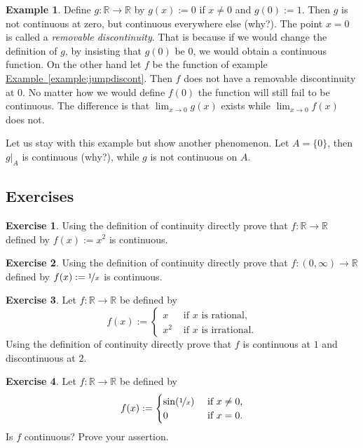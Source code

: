 \documentclass[12pt]{book}
\newcommand{\R}{{\mathbb{R}}}
\newcommand{\myindex}[1]{#1\index{#1}}
\theoremstyle{plain}
\theoremstyle{remark}
\theoremstyle{definition}
\theoremstyle{exercise}
\newtheorem{exercise}{Exercise}[section]
\theoremstyle{example}
\newtheorem{example}[thm]{Example}
\newcommand{\exampleref}[1]{\hyperref[#1]{Example~\ref*{#1}}}
\begin{document}
\begin{example}
Define
$g \colon \R \to \R$ by $g(x) := 0$ if $x \not= 0$ and
$g(0) := 1$.  Then $g$ is not continuous at zero, but continuous everywhere else (why?).
The point $x=0$ is called a \emph{\myindex{removable discontinuity}}.  That
is because if we would change the definition of $g$, by insisting that
$g(0)$ be $0$, we would obtain a continuous function.  On the other hand
let $f$ be the function of example \exampleref{example:jumpdiscont}.
Then $f$ does not have a
removable discontinuity at $0$.  No matter how we would define $f(0)$ the function
will still fail to be continuous.  The difference is that 
$\lim_{x\to 0} g(x)$ exists while
$\lim_{x\to 0} f(x)$ does not.

Let us stay with this example but show another phenomenon.  Let $A = \{ 0
\}$, then $g|_A$ is continuous (why?), while $g$ is not continuous on $A$.
\end{example}

\subsection{Exercises}

\begin{exercise}
Using the definition of continuity directly prove that
$f \colon \R \to \R$ defined by
$f(x) := x^2$ is continuous.
\end{exercise}

\begin{exercise}
Using the definition of continuity directly prove that
$f \colon (0,\infty) \to \R$ defined by
$f(x) := \nicefrac{1}{x}$ is continuous.
\end{exercise}

\begin{exercise}
Let $f \colon \R \to \R$ be defined by
\begin{equation*}
f(x) :=
\begin{cases}
x & \text{ if $x$ is rational,} \\
x^2 & \text{ if $x$ is irrational.}
\end{cases}
\end{equation*}
Using the definition of continuity directly prove that
$f$ is continuous at $1$ and discontinuous at $2$.
\end{exercise}

\begin{exercise}
Let $f \colon \R \to \R$ be
defined by
\begin{equation*}
f(x) :=
\begin{cases}
\sin(\nicefrac{1}{x}) & \text{ if $x \not= 0$,} \\
0 & \text{ if $x=0$.}
\end{cases}
\end{equation*}
Is $f$ continuous?  Prove your assertion.
\end{exercise}
\end{document}
